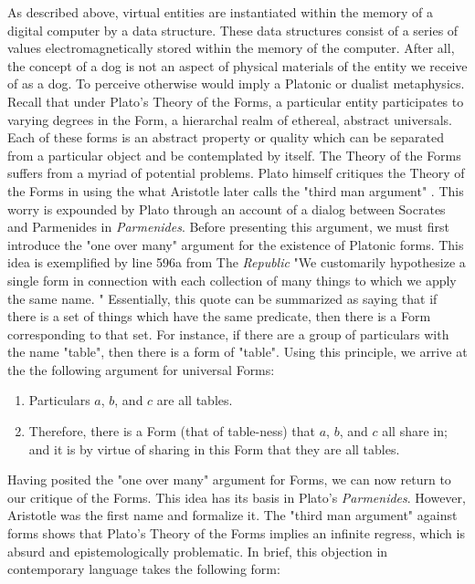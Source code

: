 As described above, virtual entities are instantiated within the memory of a digital computer by a data structure. These data structures consist of a series of values electromagnetically stored within the memory of the computer. After all, the concept of a dog is not an aspect of physical materials of the entity we receive of as a dog. To perceive otherwise would imply a Platonic or dualist metaphysics. Recall that under Plato's Theory of the Forms, a particular entity participates to varying degrees in the Form, a hierarchal realm of  ethereal, abstract universals. Each of these forms is an abstract property or quality which can be separated from a particular object and be contemplated by itself. The Theory of the Forms suffers from a myriad of potential problems. Plato himself critiques the Theory of the Forms in \cite{plato1921plato} using the what Aristotle later calls the "third man argument" \cite{aristotle1992on}. This worry is expounded by Plato through an account of a dialog between Socrates and Parmenides in \textit{Parmenides}. Before presenting this argument, we must first introduce the "one over many" argument for the existence of Platonic forms. This idea is exemplified by line 596a from The \textit{Republic} "We customarily hypothesize a single form in connection with each collection of many things to which we apply the same name.
 " \cite{plato2014the} Essentially, this quote can be summarized as saying that if there is a set of things which have the same predicate, then there is a Form corresponding to that set. For instance, if there are a group of particulars with the name "table", then there is a form of "table". Using this principle, we arrive at the the following argument for universal Forms:
 \begin{enumerate}
 	\item Particulars $a$, $b$, and $c$ are all tables.
 	\item Therefore, there is a Form (that of table-ness) that $a$, $b$, and $c$ all share in; and it is by virtue of sharing in this Form that they are all tables.	
 \end{enumerate} 
 Having posited the "one over many" argument for Forms, we can now return to our critique of the Forms. This idea has its basis in Plato's 
 \textit{Parmenides}. However, Aristotle was the first name and formalize it. The "third man argument" against forms shows that Plato's Theory of the Forms implies an infinite regress, which is absurd and epistemologically problematic. \cite{bibid}
 In brief, this objection in contemporary language takes the following form:
